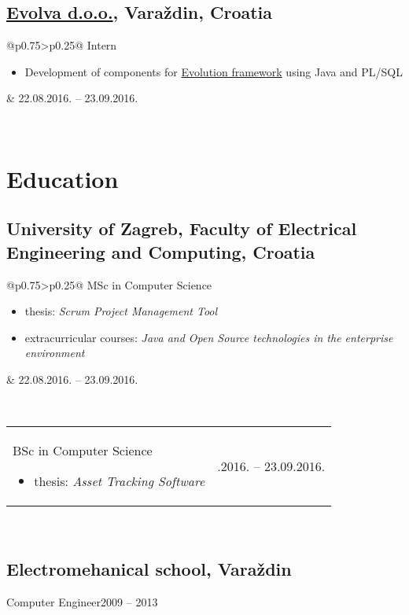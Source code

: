 \documentclass[a4paper]{article}
\makeatletter
\newlength{\tablewidth}
\newenvironment{period}[2]{%
\newcommand{\sarma}{#2}%
\setlength{\tablewidth}{\linewidth}
\addtolength{\tablewidth}{-2\tabcolsep}
\begin{tabular}{@{}p{0.75\tablewidth}>{\raggedleft\arraybackslash}p{0.25\tablewidth}@{}}%
#1 \newline
\begin{itemize}
}{%
\end{itemize} & \sarma \\%
\end{tabular}\\
}
\newenvironment{blank-period}[2]{%
\newcommand{\sarma}{#2}%
\setlength{\tablewidth}{\linewidth}
\addtolength{\tablewidth}{-2\tabcolsep}
\begin{tabular}{@{}p{0.75\tablewidth}>{\raggedleft\arraybackslash}p{0.25\tablewidth}@{}}%
#1 \newline & \sarma \\%
\end{tabular}\\
}
\makeatother
\begin{document}
\subsection{\href{http://www.evolva.hr/hr/index.html}{Evolva d.o.o.}, Vara\v{z}din, Croatia}
\begin{period}{Intern}{22.08.2016. -- 23.09.2016.}
    \item
        Development of components for \href{http://www.evolution-framework.com/}{Evolution framework} using Java and PL/SQL
\end{period}

\section{Education}
\subsection{University of Zagreb, Faculty of Electrical Engineering and Computing, Croatia}
\begin{period}{MSc in Computer Science}{2016 -- 2018}
    \item thesis:
        \textit{Scrum Project Management Tool}
    \item extracurricular courses: 
        \textit{Java and Open Source technologies in the enterprise environment}
\end{period}
\begin{period}{BSc in Computer Science}{2013 -- 2016}
    \item thesis:
        \textit{Asset Tracking Software}
\end{period}
\subsection{Electromehanical school, Vara\v{z}din}
\begin{blank-period}{Computer Engineer}{2009 -- 2013}
\end{blank-period}
\end{document}
